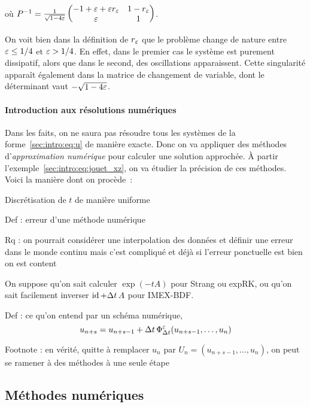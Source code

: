 où $P^{-1} = \frac{1}{\sqrt{1 - 4\varepsilon}} \begin{pmatrix}
    -1 + \varepsilon + \varepsilon r_{\varepsilon}  &  1 - r_{\varepsilon} \\
                \varepsilon         &      1
\end{pmatrix}$.
\begin{FRremark*}
    On voit bien dans la définition de $r_{\varepsilon}$ que le problème change de nature entre $\varepsilon \leq 1/4$ et $\varepsilon > 1/4$. En effet, dans le premier cas le système est purement dissipatif, alors que dans le second, des oscillations apparaissent. Cette singularité apparaît également dans la matrice de changement de variable, dont le déterminant vaut $-\sqrt{1 - 4\varepsilon}$.
\end{FRremark*}


\paragraph{Introduction aux résolutions numériques\\}
Dans les faits, on ne saura pas résoudre tous les systèmes de la forme~\eqref{sec:intro:eq:u} de manière exacte. Donc on va appliquer des méthodes d'\textit{approximation numérique} pour calculer une solution approchée. À partir l'exemple~\eqref{sec:intro:eq:jouet_xz}, on va étudier la précision de ces méthodes. Voici la manière dont on procède~:

Discrétisation de $t$ de manière uniforme

Def : erreur d’une méthode numérique 

Rq : on pourrait considérer une interpolation des données et définir une erreur dans le monde continu mais c’est compliqué et déjà si l'erreur ponctuelle est bien on est content

On suppose qu’on sait calculer $\exp(-t A)$ pour Strang ou expRK, ou qu’on sait facilement inverser $\operatorname{id} + \Delta t \, A$ pour IMEX-BDF.

Def : ce qu’on entend par un schéma numérique, $$u_{n+s} = u_{n+s-1} + \Delta t\, \Phi^{\varepsilon}_{\Delta t} (u_{n+s-1}, \ldots, u_n)$$

Footnote : en vérité, quitte à remplacer $u_n$ par $U_n = (u_{n+s-1}, \ldots, u_n)$, on peut se ramener à des méthodes à une seule étape


\subsection*{Méthodes numériques}

